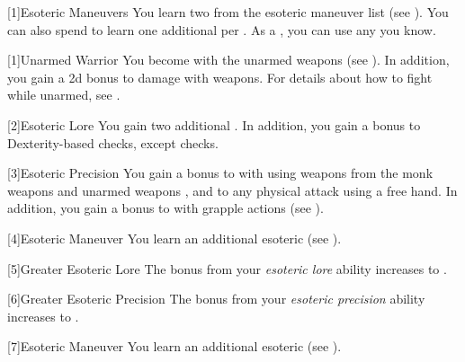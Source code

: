         [1]{Esoteric Maneuvers} 
        You learn two  from the esoteric maneuver list (see ).
        You can also spend  to learn one additional  per .
        As a , you can use any  you know.

        [1]{Unarmed Warrior} You become  with the unarmed weapons  (see ).
        In addition, you gain a \plus2d bonus to damage with  weapons.
        For details about how to fight while unarmed, see .

        [2]{Esoteric Lore} You gain two additional .
        In addition, you gain a  bonus to Dexterity-based checks, except  checks.

        [3]{Esoteric Precision} You gain a  bonus to  with  using weapons from the monk weapons and unarmed weapons , and to any physical attack using a free hand.
        In addition, you gain a  bonus to  with grapple actions (see ).




        [4]{Esoteric Maneuver} You learn an additional esoteric  (see ).

        [5]{Greater Esoteric Lore} The bonus from your \textit{esoteric lore} ability increases to .

        [6]{Greater Esoteric Precision} The bonus from your \textit{esoteric precision} ability increases to .

        [7]{Esoteric Maneuver} You learn an additional esoteric  (see ).

